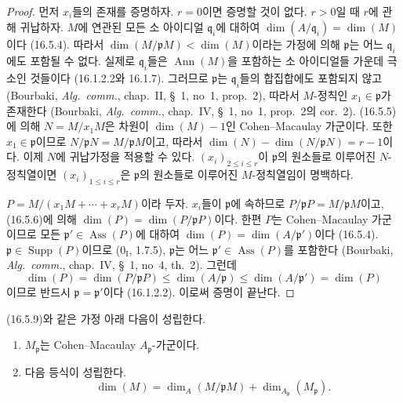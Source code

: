 \begin{proof}
먼저 $x_i$들의 존재를 증명하자. $r=0$이면 증명할 것이 없다.
$r>0$일 때 $r$에 관해 귀납하자. $M$에 연관된 모든 소 아이디얼
$\mathfrak{q}_i$에 대하여
$\dim(A/\mathfrak{q}_i)=\dim(M)$이다 (16.5.4). 따라서
$\dim(M/\mathfrak{p}M)<\dim(M)$이라는 가정에 의해
$\mathfrak{p}$는 어느 $\mathfrak{q}_i$에도 포함될 수 없다. 실제로
$\mathfrak{q}_i$들은 $\operatorname{Ann}(M)$을 포함하는 소
아이디얼들 가운데 극소인 것들이다 (16.1.2.2와 16.1.7). 그러므로
$\mathfrak{p}$는 $\mathfrak{q}_i$들의 합집합에도 포함되지 않고
(Bourbaki, \emph{Alg.~comm.}, chap.~II, \S~1, no~1, prop.~2), 따라서
$M$-정칙인 $x_1\in\mathfrak{p}$가 존재한다
(Bourbaki, \emph{Alg.~comm.}, chap.~IV, \S~1, no~1, prop.~2의
cor.~2). (16.5.5)에 의해 $N=M/x_1M$은 차원이
$\dim(M)-1$인 Cohen--Macaulay 가군이다. 또한
$x_1\in\mathfrak{p}$이므로
$N/\mathfrak{p}N=M/\mathfrak{p}M$이고, 따라서
$\dim(N)-\dim(N/\mathfrak{p}N)=r-1$이다. 이제 $N$에 귀납가정을
적용할 수 있다. $(x_i)_{2\leq i\leq r}$이 $\mathfrak{p}$의
원소들로 이루어진 $N$-정칙열이면
$(x_i)_{1\leq i\leq r}$은 $\mathfrak{p}$의 원소들로 이루어진
$M$-정칙열임이 명백하다.

$P=M/(x_1M+\cdots+x_rM)$이라 두자. $x_i$들이
$\mathfrak{p}$에 속하므로
$P/\mathfrak{p}P=M/\mathfrak{p}M$이고, (16.5.6)에 의해
$\dim(P)=\dim(P/\mathfrak{p}P)$이다. 한편 $P$는 Cohen--Macaulay
가군이므로 모든 $\mathfrak{p}'\in\operatorname{Ass}(P)$에 대하여
$\dim(P)=\dim(A/\mathfrak{p}')$이다 (16.5.4).
$\mathfrak{p}\in\operatorname{Supp}(P)$이므로
($0_{\mathrm I}$, 1.7.5), $\mathfrak{p}$는 어느
$\mathfrak{p}'\in\operatorname{Ass}(P)$를 포함한다
(Bourbaki, \emph{Alg.~comm.}, chap.~IV, \S~1, no~4, th.~2). 그런데
\[
  \dim(P)=\dim(P/\mathfrak{p}P)
  \leq\dim(A/\mathfrak{p})
  \leq\dim(A/\mathfrak{p}')=\dim(P)
\]
이므로 반드시 $\mathfrak{p}=\mathfrak{p}'$이다 (16.1.2.2). 이로써
증명이 끝난다.
\end{proof}

\begin{corollary}[16.5.10]
\label{0.16.5.10-fr}
(16.5.9)와 같은 가정 아래 다음이 성립한다.
\begin{enumerate}
  \item[(i)] $M_{\mathfrak{p}}$는 Cohen--Macaulay
  $A_{\mathfrak{p}}$-가군이다.
  \item[(ii)] 다음 등식이 성립한다.
  \begin{equation}
  \label{0.16.5.10.1-fr}
  \tag{16.5.10.1}
    \dim(M)=\dim_A(M/\mathfrak{p}M)
    +\dim_{A_{\mathfrak{p}}}(M_{\mathfrak{p}}).
  \end{equation}
\end{enumerate}
\end{corollary}

